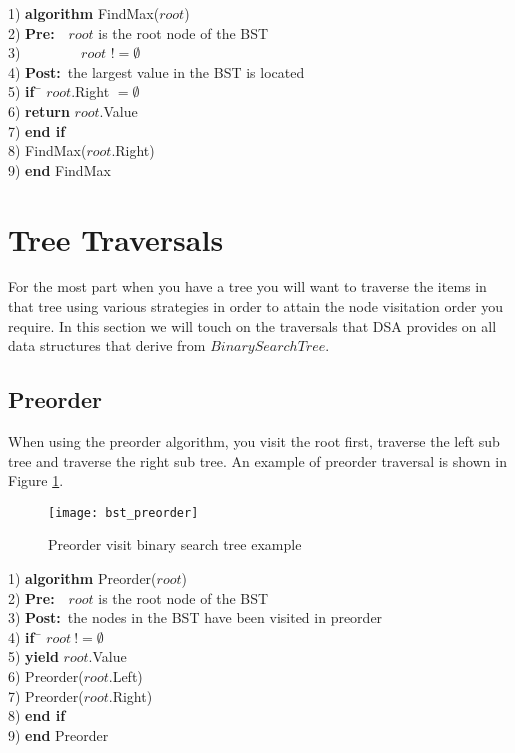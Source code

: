 \begin{tabbing}
1)  \textbf{alg}\= \textbf{orithm} FindMax($root$) \\
2)  \> \textbf{Pre:}~~$root$ is the root node of the BST \\
3)  \> ~~~~~~~~$root$ $!= \emptyset$ \\
4)  \> \textbf{Post:}~the largest value in the BST is located \\
5)  \> \textbf{if}~\= $root$.Right $= \emptyset$ \\
6)  \> \> \textbf{return} $root$.Value \\
7)  \> \textbf{end if} \\
8)  \> FindMax($root$.Right) \\
9)  \textbf{end} FindMax \\
\end{tabbing}

\section{Tree Traversals}
For the most part when you have a tree you will want to traverse the items in that tree using various strategies in order to attain the node visitation order you require. In this section we will touch on the traversals that DSA provides on all data structures that derive from $BinarySearchTree$.

\subsection{Preorder} \label{preorder_traversal}
When using the preorder algorithm, you visit the root first, traverse the left sub tree and traverse the right sub tree. An example of preorder traversal is shown in Figure \ref{fig:bst_preorder}.
\begin{figure}[htp]
\begin{center}
\texttt{[image: bst\_preorder]}
\end{center}
\caption{Preorder visit binary search tree example} \label{fig:bst_preorder}
\end{figure}


\begin{tabbing}
1)  \textbf{alg}\= \textbf{orithm} Preorder($root$) \\
2)  \> \textbf{Pre:}~~$root$ is the root node of the BST \\
3)  \> \textbf{Post:}~the nodes in the BST have been visited in preorder \\
4)  \> \textbf{if}~\= $root~!= \emptyset$ \\
5)  \> \> \textbf{yield} $root$.Value \\
6)  \> \> Preorder($root$.Left) \\
7)  \> \> Preorder($root$.Right) \\
8)  \> \textbf{end if} \\
9)  \textbf{end} Preorder \\
\end{tabbing}

